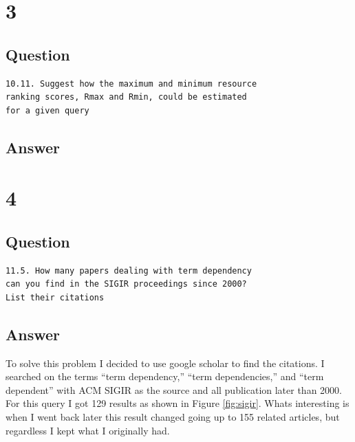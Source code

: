\documentclass[letterpaper,11pt]{article}
\newcommand*{\srcPath}{../src}%
\begin{document}
% 

\clearpage


\section*{3}

\subsection*{Question}

\begin{verbatim}
10.11. Suggest how the maximum and minimum resource 
ranking scores, Rmax and Rmin, could be estimated 
for a given query
\end{verbatim}

\subsection*{Answer}


\clearpage


\section*{4}

\subsection*{Question}

\begin{verbatim}
11.5. How many papers dealing with term dependency 
can you find in the SIGIR proceedings since 2000?
List their citations
\end{verbatim}

\subsection*{Answer}

To solve this problem I decided to use google scholar to find the citations.
I searched on the terms ``term dependency,'' ``term dependencies,'' and ``term dependent'' with ACM SIGIR as the source and all publication later than 2000.
For this query I got 129 results as shown in Figure \ref{fig:sigir}.
Whats interesting is when I went back later this result changed going up to 155 related articles, but regardless I kept what I originally had.
\end{document}
